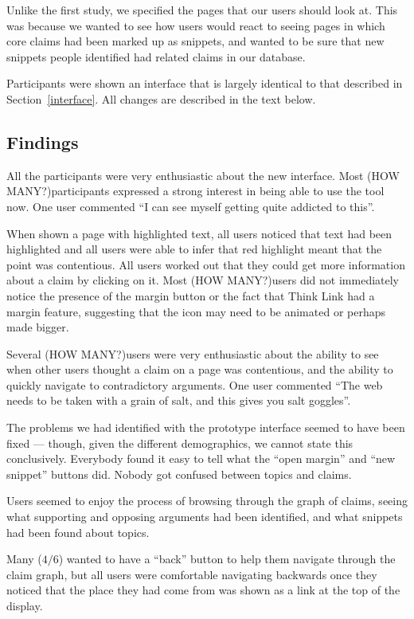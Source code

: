 \documentclass{chi2009}
\newcommand{\howmany}{{\color{red} (HOW MANY?)}}
\begin{document}
Unlike the first study, we specified the pages that our users should look at. This was because we wanted to see how users would react to seeing pages in which core claims had been marked up as snippets, and wanted to be sure that new snippets people identified had related claims in our database.

Participants were shown an interface that is largely identical to that described in Section~\ref{interface}. All changes are described in the text below.

\subsection{Findings}

All the participants were very enthusiastic about the new interface. Most \howmany participants expressed a strong interest in being able to use the tool now. One user commented ``I can see myself getting quite addicted to this''.

When shown a page with highlighted text, all users noticed that text had been highlighted and all users were able to infer that red highlight meant that the point was contentious. All users worked out that they could get more information about a claim by clicking on it. Most \howmany users did not immediately notice the presence of the margin button or the fact that Think Link had a margin feature, suggesting that the icon may need to be animated or perhaps made bigger.

Several \howmany users were very enthusiastic about the ability to see when other users thought a claim on a page was contentious, and the ability to quickly navigate to contradictory arguments. One user commented ``The web needs to be taken with a grain of salt, and this gives you salt goggles''.

The problems we had identified with the prototype interface seemed to have been fixed --- though, given the different demographics, we cannot state this conclusively. Everybody found it easy to tell what the ``open margin'' and ``new snippet'' buttons did. Nobody got confused between topics and claims. 

Users seemed to enjoy the process of browsing through the graph of claims, seeing what supporting and opposing arguments had been identified, and what snippets had been found about topics.

Many ($4/6$) wanted to have a ``back'' button to help them navigate through the claim graph, but all users were comfortable navigating backwards once they noticed that the place they had come from was shown as a link at the top of the display.
\end{document}
